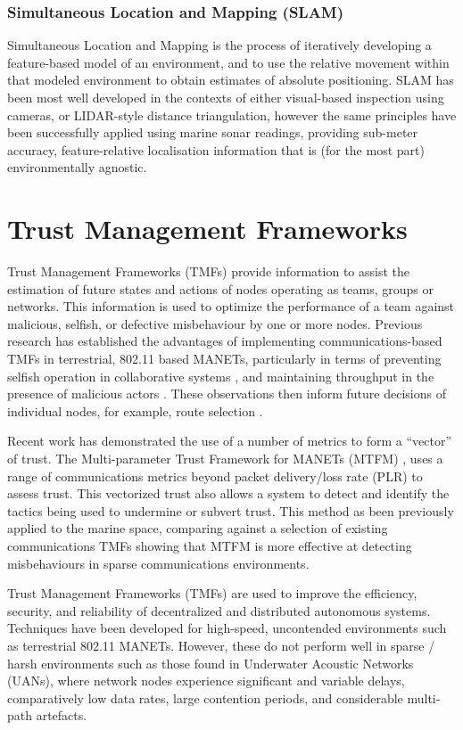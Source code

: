 \documentclass[conference]{IEEEtran}
\begin{document}
\subsubsection{Simultaneous Location and Mapping (SLAM)}
Simultaneous Location and Mapping is the process of iteratively developing a feature-based model of an environment, and to use the relative movement within that modeled environment to obtain estimates of absolute positioning.
SLAM has been most well developed in the contexts of either visual-based inspection using cameras, or LIDAR-style distance triangulation, however the same principles have been successfully applied using marine sonar readings, providing sub-meter accuracy, feature-relative localisation information that is (for the most part) environmentally agnostic\cite{Williams2000}.


\section{Trust Management Frameworks}\label{sec:tmfs}

Trust Management Frameworks (TMFs) provide information to assist the estimation of future states and actions of nodes operating as teams, groups or networks. 
This information is used to optimize the performance of a team against malicious, selfish, or defective misbehaviour by one or more nodes.
Previous research has established the advantages of implementing communications-based TMFs in terrestrial, 802.11 based MANETs, particularly in terms of preventing selfish operation in collaborative systems \cite{Li2007}, and maintaining throughput in the presence of malicious actors \cite{Buchegger2002}. 
These observations then inform future decisions of individual nodes, for example, route selection \cite{Li2008}.

Recent work has demonstrated the use of a number of metrics to form a ``vector'' of trust. The Multi-parameter Trust Framework for MANETs (MTFM) \cite{Guo11}, uses a range of communications metrics beyond packet delivery/loss rate (PLR) to assess trust. This vectorized trust also allows a system to detect and identify the tactics being used to undermine or subvert trust. 
This method as been previously applied to the marine space, comparing against a selection of existing communications TMFs \cite{Bolster2015} showing that MTFM is more effective at detecting misbehaviours in sparse communications environments. 


Trust Management Frameworks (TMFs) are used to improve the efficiency, security, and reliability of decentralized and distributed autonomous systems. 
Techniques have been developed for high-speed, uncontended environments such as terrestrial 802.11 MANETs. 
However, these do not perform well in sparse / harsh environments such as those found in Underwater Acoustic Networks (UANs), where network nodes experience significant and variable delays, comparatively low data rates, large contention periods, and considerable multi-path artefacts.\cite{Bolster2015} 
\end{document}
